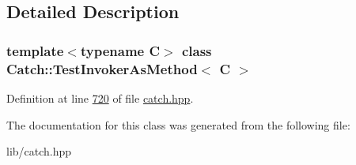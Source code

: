 \subsection{Detailed Description}
\subsubsection*{template$<$typename C$>$\newline
class Catch\+::\+Test\+Invoker\+As\+Method$<$ C $>$}



Definition at line \mbox{\hyperlink{catch_8hpp_source_l00720}{720}} of file \mbox{\hyperlink{catch_8hpp_source}{catch.\+hpp}}.



The documentation for this class was generated from the following file\+:\begin{DoxyCompactItemize}
\item 
lib/catch.\+hpp\end{DoxyCompactItemize}
